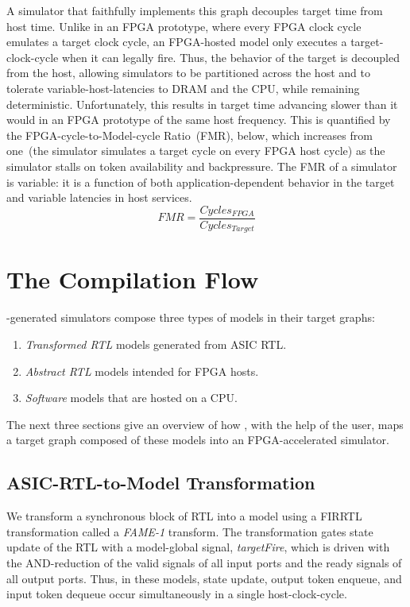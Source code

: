 A simulator that faithfully implements this graph decouples target time from
host time. Unlike in an FPGA prototype, where every FPGA clock cycle emulates a
target clock cycle, an FPGA-hosted model only executes a target-clock-cycle when
it can legally fire. Thus, the behavior of the target is decoupled from the
host, allowing simulators to be partitioned across the host and to tolerate
variable-host-latencies to DRAM and the CPU, while remaining deterministic.
Unfortunately, this results in target time advancing slower than it would in an
FPGA prototype of the same host frequency.  This is quantified by the
FPGA-cycle-to-Model-cycle Ratio~(FMR)\cite{APortNetworks}, below, which increases from
one~(the simulator simulates a target cycle on every FPGA host cycle) as the simulator stalls on token availability and backpressure. The FMR
of a simulator is variable: it is a function of both application-dependent
behavior in the target and variable latencies in host services.
$$ FMR = \frac{Cycles_{FPGA}}{Cycles_{Target}}$$

\section{The \SIMNAME Compilation Flow}\label{sec:fame1}
\SIMNAME-generated simulators compose three types of models in their target graphs:
\begin{enumerate}
    \item \emph{Transformed RTL} models generated from ASIC RTL.
    \item \emph{Abstract RTL} models intended for FPGA hosts.
    \item \emph{Software} models that are hosted on a CPU.
\end{enumerate}

The next three sections give an overview of how \SIMNAME, with the help of the
user, maps a target graph composed of these models into an FPGA-accelerated
simulator.

\subsection{ASIC-RTL-to-Model Transformation}\label{sec:fame1}
We transform a synchronous block of RTL into a model using a FIRRTL~\cite{firrtl} transformation called a \emph{FAME-1}
transform. The transformation gates state update of the RTL with a model-global
signal, \emph{targetFire}, which is driven with the AND-reduction of the valid
signals of all input ports and the ready signals of all output ports.  Thus, in
these models, state update, output token enqueue, and input token dequeue occur
simultaneously in a single host-clock-cycle.

